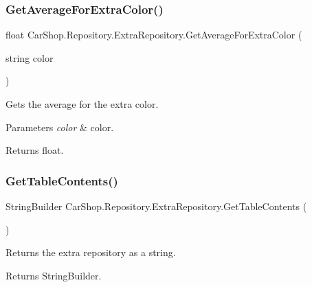 \subsubsection{\texorpdfstring{Get\+Average\+For\+Extra\+Color()}{GetAverageForExtraColor()}}
{\footnotesize\ttfamily float Car\+Shop.\+Repository.\+Extra\+Repository.\+Get\+Average\+For\+Extra\+Color (\begin{DoxyParamCaption}\item[{string}]{color }\end{DoxyParamCaption})}



Gets the average for the extra color. 


\begin{DoxyParams}{Parameters}
{\em color} & color.\\
\hline
\end{DoxyParams}
\begin{DoxyReturn}{Returns}
float.
\end{DoxyReturn}
\mbox{\label{class_car_shop_1_1_repository_1_1_extra_repository_af2f4e893243faab043677e5df69b822d}} 
\subsubsection{\texorpdfstring{Get\+Table\+Contents()}{GetTableContents()}}
{\footnotesize\ttfamily String\+Builder Car\+Shop.\+Repository.\+Extra\+Repository.\+Get\+Table\+Contents (\begin{DoxyParamCaption}{ }\end{DoxyParamCaption})}



Returns the extra repository as a string. 

\begin{DoxyReturn}{Returns}
String\+Builder.
\end{DoxyReturn}
\mbox{\label{class_car_shop_1_1_repository_1_1_extra_repository_a52a8367258e2eb413f8160a040c6ac61}} 
